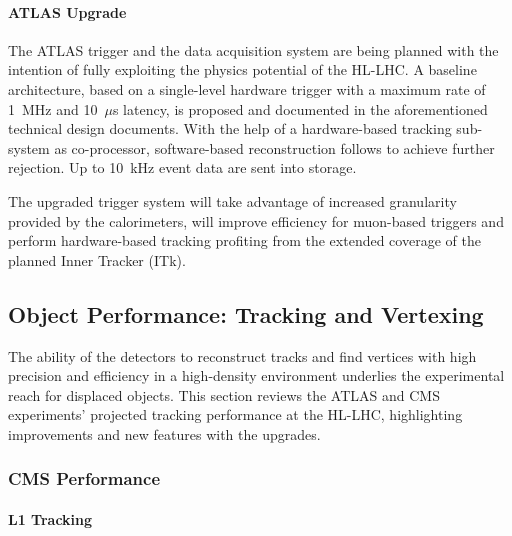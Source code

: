\paragraph{ATLAS Upgrade}




The ATLAS trigger and the data acquisition system are being planned with the intention of fully exploiting the physics potential of the HL-LHC. A baseline architecture, based on a single-level hardware trigger with a maximum rate of 1~MHz and 10~$\mu$s latency, is proposed and documented in the aforementioned technical design documents. %
With the help of a hardware-based tracking sub-system as co-processor, software-based reconstruction follows to achieve further rejection. Up to 10~kHz event data are sent into storage.

The upgraded trigger system will take advantage of increased granularity provided by the calorimeters, will improve efficiency for muon-based triggers and perform hardware-based tracking profiting from the extended coverage of the planned Inner Tracker (ITk).

\subsection{Object Performance: Tracking and Vertexing} \label{sec:upgradeobject}

The ability of the detectors to reconstruct tracks and find vertices with high precision and efficiency in a high-density environment underlies the experimental reach for displaced objects. This section reviews the ATLAS and CMS experiments' projected tracking performance at the HL-LHC, highlighting improvements and new features with the upgrades.

\subsubsection{CMS Performance}

\paragraph{L1 Tracking}

